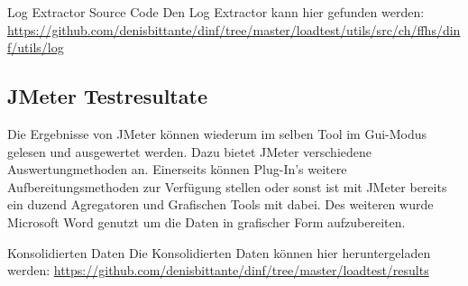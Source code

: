 \documentclass[main.tex]{subfiles}
\begin{document}
\begin{reference}{Log Extractor Source Code}
Den Log Extractor kann hier gefunden werden:  \url{https://github.com/denisbittante/dinf/tree/master/loadtest/utils/src/ch/ffhs/dinf/utils/log}
 
\end{reference}



\subsection{JMeter Testresultate}


Die Ergebnisse von JMeter können wiederum im selben Tool im Gui-Modus gelesen und ausgewertet werden. Dazu bietet JMeter verschiedene Auswertungmethoden an. Einerseits können Plug-In's weitere Aufbereitungsmethoden zur Verfügung stellen oder sonst ist mit JMeter bereits ein duzend Agregatoren und Grafischen Tools mit dabei. Des weiteren wurde Microsoft Word genutzt um die Daten in grafischer Form aufzubereiten. 

\begin{reference}{Konsolidierten Daten}
Die Konsolidierten Daten können hier heruntergeladen werden:  \url{https://github.com/denisbittante/dinf/tree/master/loadtest/results}
 
\end{reference}
\end{document}
